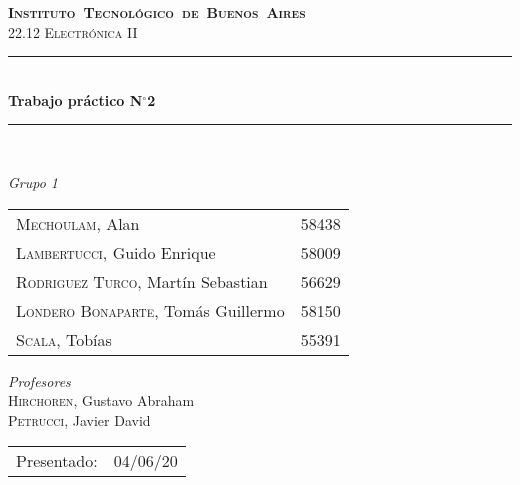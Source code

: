 \begin{titlepage}
\newcommand{\HRule}{\rule{\linewidth}{0.5mm}}
\center
\mbox{\textsc{\LARGE \bfseries {Instituto Tecnológico de Buenos Aires}}}\\[1.5cm]
\textsc{\Large 22.12 Electrónica II}\\[0.5cm]


\HRule \\[0.6cm]
{ \Huge \bfseries Trabajo práctico N$^{\circ}$2}\\[0.4cm] 
\HRule \\[1.5cm]


{\large

\emph{Grupo 1}\\
\vspace{3px}

\begin{tabular}{lr} 	
\textsc{Mechoulam}, Alan  &  58438\\
\textsc{Lambertucci}, Guido Enrique  & 58009 \\
\textsc{Rodriguez Turco}, Martín Sebastian  & 56629 \\
\textsc{Londero Bonaparte}, Tomás Guillermo  & 58150 \\
\textsc{Scala}, Tobías & 55391 \\
\end{tabular}

\vspace{20px}

\emph{Profesores}\\
\textsc{Hirchoren}, Gustavo Abraham\\
\textsc{Petrucci}, Javier David\\
\vspace{3px}

\vspace{100px}

\begin{tabular}{ll}

Presentado: & 04/06/20\\

\end{tabular}

}

\vfill

\end{titlepage}
